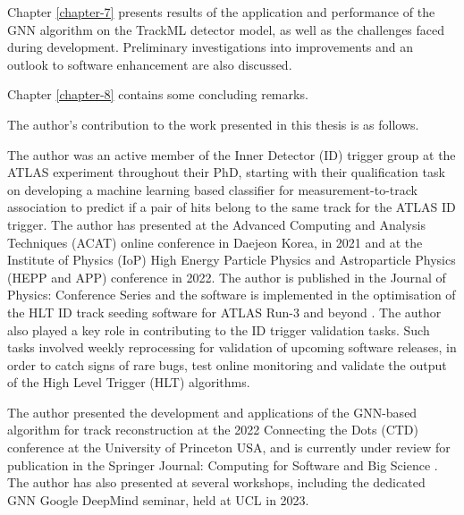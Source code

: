 Chapter \ref{chapter-7} presents results of the application and performance of the GNN algorithm on the TrackML detector model, as well as the challenges faced during development. Preliminary investigations into improvements and an outlook to software enhancement are also discussed.

Chapter \ref{chapter-8} contains some concluding remarks.

The author’s contribution to the work presented in this thesis is as follows.

The author was an active member of the Inner Detector (ID) trigger group at the ATLAS experiment throughout their PhD, starting with their qualification task on developing a machine learning based classifier for measurement-to-track association to predict if a pair of hits belong to the same track for the ATLAS ID trigger. The author has presented at the Advanced Computing and Analysis Techniques (ACAT) online conference in Daejeon Korea, in 2021 and at the Institute of Physics (IoP) High Energy Particle Physics and Astroparticle Physics (HEPP and APP) conference in 2022. The author is published in the Journal of Physics: Conference Series \cite{Lad_2023} and the software is implemented in the optimisation of the HLT ID track seeding software for ATLAS Run-3 and beyond \cite{Grandi:2728111, Long:2813981}. The author also played a key role in contributing to the ID trigger validation tasks. Such tasks involved weekly reprocessing for validation of upcoming software releases, in order to catch signs of rare bugs, test online monitoring and validate the output of the High Level Trigger (HLT) algorithms.

The author presented the development and applications of the GNN-based algorithm for track reconstruction at the 2022 Connecting the Dots (CTD) conference at the University of Princeton USA, and is currently under review for publication in the Springer Journal: Computing for Software and Big Science \cite{Lad_2023_gnn}. The author has also presented at several workshops, including the dedicated GNN Google DeepMind seminar, held at UCL in 2023.

